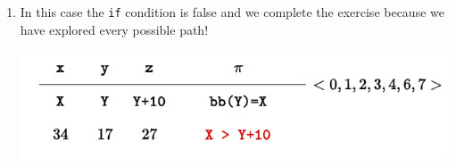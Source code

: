 \begin{examplebox}
\begin{enumerate}
        \item In this case the \texttt{if} condition is false and we complete the exercise because we have explored every possible path!
        \begin{center}
            \includegraphics[width=.8\textwidth]{img/concolic-execution-13.pdf}
        \end{center}
    \end{enumerate}
\end{examplebox}